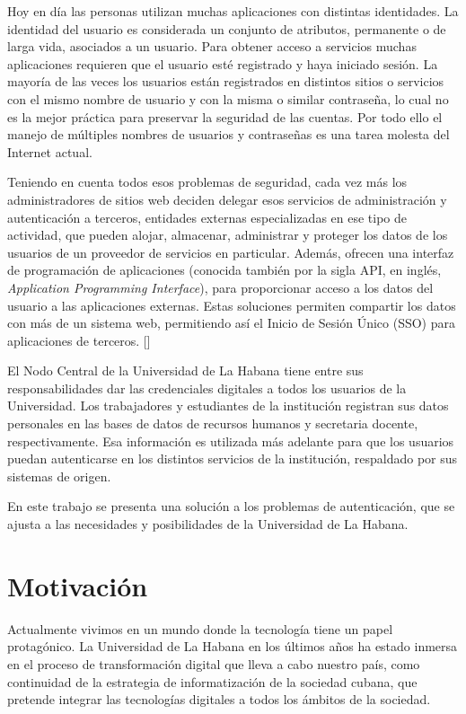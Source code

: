Hoy en día las personas utilizan muchas aplicaciones con distintas identidades. La identidad del usuario es considerada un conjunto de atributos, permanente o de larga vida, asociados a un usuario. Para obtener acceso a servicios muchas aplicaciones requieren que el usuario esté registrado y haya iniciado sesión. La mayoría de las veces los usuarios están registrados en distintos sitios o servicios con el mismo nombre de usuario y con la misma o similar contraseña, lo cual no es la mejor práctica para preservar la seguridad de las cuentas. Por todo ello el manejo de múltiples nombres de usuarios y contraseñas es una tarea molesta del Internet actual.

Teniendo en cuenta todos esos problemas de seguridad, cada vez más los administradores de sitios web deciden delegar esos servicios de administración y autenticación a terceros, entidades externas especializadas en ese tipo de actividad, que pueden alojar, almacenar, administrar y proteger los datos de los usuarios de un proveedor de servicios en particular. Además, ofrecen una interfaz de programación de aplicaciones (conocida también por la sigla API, en inglés, \textit{Application Programming Interface}), para proporcionar acceso a los datos del usuario a las aplicaciones externas. Estas soluciones permiten compartir los datos con más de un sistema web, permitiendo así el Inicio de Sesión Único (SSO) para aplicaciones de terceros. [\cite{kutera2016single}]

El Nodo Central de la Universidad de La Habana tiene entre sus responsabilidades dar las credenciales digitales a todos los usuarios de la Universidad. Los trabajadores y estudiantes de la institución registran sus datos personales en las bases de datos de recursos humanos y secretaria docente, respectivamente. Esa información es utilizada más adelante para que los usuarios puedan autenticarse en los distintos servicios de la institución, respaldado por sus sistemas de origen.

En este trabajo se presenta una solución a los problemas de autenticación, que se ajusta a las necesidades y posibilidades de la Universidad de La Habana.  

\section*{Motivación}
Actualmente vivimos en un mundo donde la tecnología tiene un papel protagónico. La Universidad de La Habana en los últimos años ha estado inmersa en el proceso de transformación digital que lleva a cabo nuestro país, como continuidad de la estrategia de informatización de la sociedad cubana, que pretende integrar las tecnologías digitales a todos los ámbitos de la sociedad.


